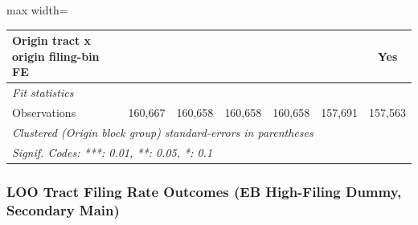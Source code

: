 \documentclass[
  11pt,
]{article}
\begin{document}
\begin{adjustbox}{max width=\textwidth}
\begin{tabular}{lcccccc}
   Origin tract x origin filing-bin FE            &                        &                &                &                &                       & Yes\\  
   \midrule
   \emph{Fit statistics}\\
   Observations                                   & 160,667                & 160,658        & 160,658        & 160,658        & 157,691               & 157,563\\  
   \midrule \midrule
   \multicolumn{7}{l}{\emph{Clustered (Origin block group) standard-errors in parentheses}}\\
   \multicolumn{7}{l}{\emph{Signif. Codes: ***: 0.01, **: 0.05, *: 0.1}}\\
\end{tabular}
\par\endgroup

\end{adjustbox}

\subsubsection{LOO Tract Filing Rate Outcomes (EB High-Filing Dummy,
Secondary
Main)}\label{loo-tract-filing-rate-outcomes-eb-high-filing-dummy-secondary-main}
\end{document}
